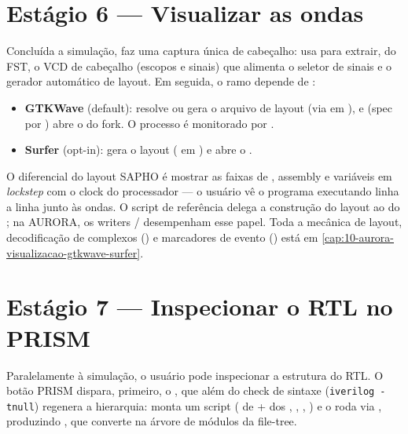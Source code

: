 \section{Estágio 6 — Visualizar as ondas}
\label{sec:17-visualizar}

Concluída a simulação,  faz uma captura única de cabeçalho:
 usa  para extrair, do FST, o VCD de
cabeçalho (escopos e sinais) que alimenta o seletor de sinais e o gerador
automático de layout. Em seguida, o ramo depende de :

\begin{itemize}[leftmargin=1.4em]
  \item \textbf{GTKWave} (default):  resolve ou
        gera o arquivo de layout  (via  em
        ), e  (spec por
        ) abre o  do fork. O processo é
        monitorado por .
  \item \textbf{Surfer} (opt-in):  gera o layout
        ( em ) e
         abre o .
\end{itemize}

O diferencial do layout SAPHO é mostrar as faixas de \cmm{}, assembly e variáveis
em \emph{lockstep} com o clock do processador — o usuário vê o programa executando
linha a linha junto às ondas. O script de referência delega a construção do layout
ao  do ; na AURORA, os writers
/ desempenham esse
papel. Toda a mecânica de layout, decodificação de complexos
() e marcadores de evento () está
em \autoref{cap:10-aurora-visualizacao-gtkwave-surfer}.

\section{Estágio 7 — Inspecionar o RTL no PRISM}
\label{sec:17-prism}

Paralelamente à simulação, o usuário pode inspecionar a estrutura do RTL. O botão
PRISM dispara, primeiro, o , que além do check de sintaxe
(\lstinline|iverilog -tnull|) regenera a hierarquia: 
monta um script  ( de  + dos
, , , )
e o roda via , produzindo
, que  converte na
árvore de módulos da file-tree.

